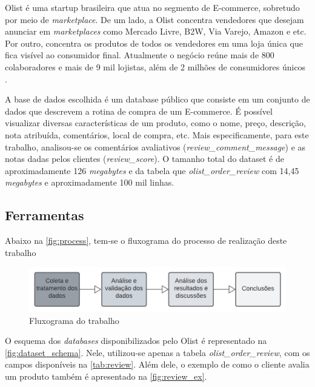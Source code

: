 Olist é uma startup brasileira que atua no segmento de E-commerce, sobretudo por meio de \textit{marketplace}. De um lado, a Olist concentra vendedores que desejam anunciar em \textit{marketplaces} como Mercado Livre, B2W, Via Varejo, Amazon e etc. Por outro, concentra os produtos de todos os vendedores em uma loja única que fica visível ao consumidor final. Atualmente o negócio reúne mais de 800 colaboradores e mais de 9 mil lojistas, além de 2 milhões de consumidores únicos \citep{Olist}.

A base de dados escolhida é um database público que consiste em um conjunto de dados que descrevem a rotina de compra de um E-commerce. É possível visualizar diversas características de um produto, como o nome, preço, descrição, nota atribuída, comentários, local de compra, etc. Mais especificamente, para este trabalho, analisou-se os comentários avaliativos (\textit{review\_comment\_message}) e as notas dadas pelos clientes (\textit{review\_score}). O tamanho total do dataset é de aproximadamente 126 \textit{megabytes} e da tabela que \textit{olist\_order\_review} com  14,45 \textit{megabytes} e aproximadamente 100 mil linhas.

\subsection{Ferramentas}

Abaixo na \autoref{fig:process}, tem-se o fluxograma do processo de realização deste trabalho

\begin{figure}[H]
    \centering
    \includegraphics[width=\linewidth, scale=0.6]{./figs/process_diagram.png}
    \caption{Fluxograma do trabalho}
    \label{fig:process}
\end{figure}

O esquema dos \textit{databases} disponibilizados pelo Olist é representado na \autoref{fig:dataset_schema}. Nele, utilizou-se apenas a tabela \textit{olist\_order\_review}, com os campos disponíveis na \autoref{tab:review}. Além dele, o exemplo de como o cliente avalia um produto também é apresentado na \autoref{fig:review_ex}.

